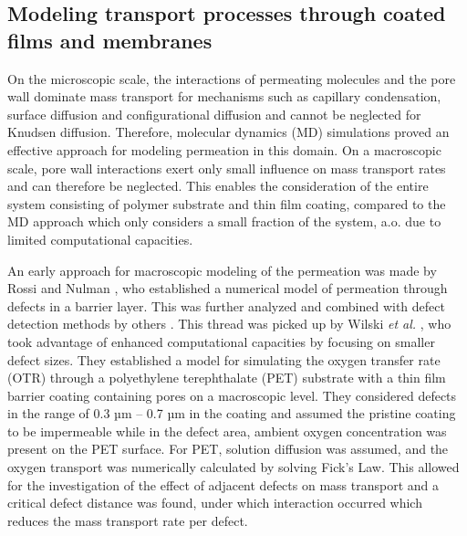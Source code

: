 \documentclass[AMA,STIX2COL]{WileyNJD-v2} %
\begin{document}
\subsection{Modeling transport processes through coated films and membranes} \label{subsec22}

On the microscopic scale, the interactions of permeating molecules and the pore wall dominate mass transport for mechanisms such as capillary condensation, surface diffusion and configurational diffusion and cannot be neglected for Knudsen diffusion. Therefore, molecular dynamics (MD) simulations proved an effective approach for modeling permeation in this domain. On a macroscopic scale, pore wall interactions exert only small influence on mass transport rates and can therefore be neglected. This enables the consideration of the entire system consisting of polymer substrate and thin film coating, compared to the MD approach which only considers a small fraction of the system, a.o. due to limited computational capacities.

An early approach for macroscopic modeling of the permeation was made by Rossi and Nulman \cite{rossi1993}, who established a numerical model of permeation through defects in a barrier layer. This was further analyzed and combined with defect detection methods by others \cite{dasilva2000,hanika2003}. This thread was picked up by Wilski \textit{et al.} \cite{Wilski_2017}, who took advantage of enhanced computational capacities by focusing on smaller defect sizes. They established a model for simulating the oxygen transfer rate (OTR) through a polyethylene terephthalate (PET) substrate with a thin film barrier coating containing pores on a macroscopic level. They considered defects in the range of 0.3 µm – 0.7 µm in the coating and assumed the pristine coating to be impermeable while in the defect area, ambient oxygen concentration was present on the PET surface. For PET, solution diffusion was assumed, and the oxygen transport was numerically calculated by solving Fick’s Law. This allowed for the investigation of the effect of adjacent defects on mass transport and a critical defect distance was found, under which interaction occurred which reduces the mass transport rate per defect.
\end{document}
